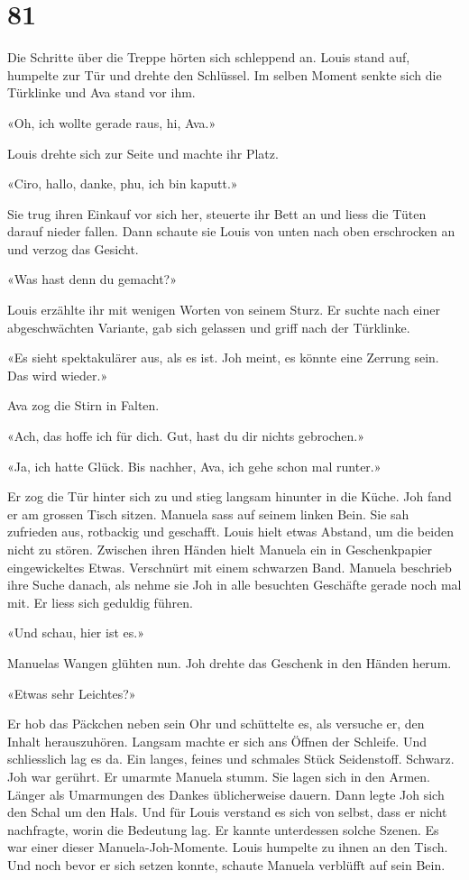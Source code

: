\chapter{81}



Die Schritte über die Treppe hörten sich schleppend an. Louis stand auf,
humpelte zur Tür und drehte den Schlüssel. Im selben Moment senkte sich
die Türklinke und Ava stand vor ihm.

«Oh, ich wollte gerade raus, hi, Ava.»

Louis drehte sich zur Seite und machte ihr Platz.

«Ciro, hallo, danke, phu, ich bin kaputt.»

Sie trug ihren Einkauf vor sich her, steuerte ihr Bett an und liess die
Tüten darauf nieder fallen. Dann schaute sie Louis von unten nach oben
erschrocken an und verzog das Gesicht.

«Was hast denn du gemacht?»

Louis erzählte ihr mit wenigen Worten von seinem Sturz. Er suchte nach
einer abgeschwächten Variante, gab sich gelassen und griff nach der
Türklinke.

«Es sieht spektakulärer aus, als es ist. Joh meint, es könnte eine
Zerrung sein. Das wird wieder.»

Ava zog die Stirn in Falten.

«Ach, das hoffe ich für dich. Gut, hast du dir nichts gebrochen.»

«Ja, ich hatte Glück. Bis nachher, Ava, ich gehe schon mal runter.»

Er zog die Tür hinter sich zu und stieg langsam hinunter in die
Küche. Joh fand er am grossen Tisch sitzen. Manuela sass auf seinem
linken Bein. Sie sah zufrieden aus, rotbackig und geschafft. Louis
hielt etwas Abstand, um die beiden nicht zu stören. Zwischen ihren
Händen hielt Manuela ein in Geschenkpapier eingewickeltes Etwas.
Verschnürt mit einem schwarzen Band. Manuela beschrieb ihre Suche
danach, als nehme sie Joh in alle besuchten Geschäfte gerade noch mal
mit. Er liess sich geduldig führen.

«Und schau, hier ist es.»

Manuelas Wangen glühten nun. Joh drehte das Geschenk in den Händen
herum.

«Etwas sehr Leichtes?»

Er hob das Päckchen neben sein Ohr und schüttelte es, als versuche er, den Inhalt herauszuhören. Langsam
machte er sich ans Öffnen der Schleife. Und schliesslich lag es da. Ein
langes, feines und schmales Stück Seidenstoff. Schwarz.
Joh war gerührt. Er umarmte Manuela stumm. Sie lagen sich in den Armen.
Länger als Umarmungen des Dankes üblicherweise dauern. Dann legte Joh
sich den Schal um den Hals. Und für Louis verstand es sich von selbst,
dass er nicht nachfragte, worin die Bedeutung lag. Er kannte unterdessen
solche Szenen. Es war einer dieser Manuela-Joh-Momente.
Louis humpelte zu ihnen an den Tisch. Und noch bevor er sich setzen konnte, 
schaute Manuela verblüfft auf sein Bein.

